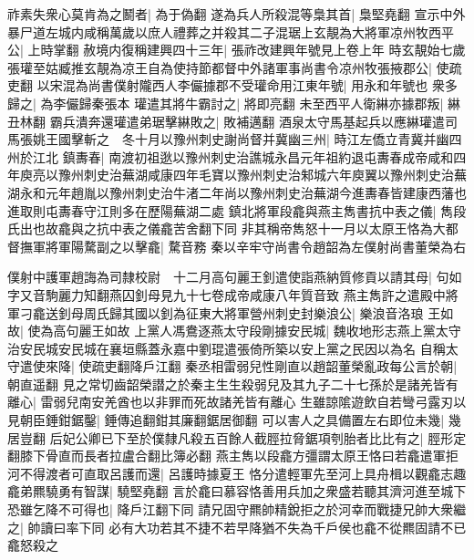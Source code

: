 祚素失衆心莫肯為之鬭者|{
	為于偽翻}
遂為兵人所殺混等梟其首|{
	梟堅堯翻}
宣示中外暴尸道左城内咸稱萬歲以庶人禮葬之并殺其二子混琚上玄靚為大將軍凉州牧西平公|{
	上時掌翻}
赦境内復稱建興四十三年|{
	張祚改建興年號見上卷上年}
時玄靚始七歲張瓘至姑臧推玄靚為凉王自為使持節都督中外諸軍事尚書令凉州牧張掖郡公|{
	使疏吏翻}
以宋混為尚書僕射隴西人李儼據郡不受瓘命用江東年號|{
	用永和年號也}
衆多歸之|{
	為李儼歸秦張本}
瓘遣其將牛霸討之|{
	將即亮翻}
未至西平人衛綝亦據郡叛|{
	綝丑林翻}
霸兵潰奔還瓘遣弟琚擊綝敗之|{
	敗補邁翻}
酒泉太守馬基起兵以應綝瓘遣司馬張姚王國擊斬之　冬十月以豫州刺史謝尚督并冀幽三州|{
	時江左僑立青冀并幽四州於江北}
鎮夀春|{
	南渡初祖逖以豫州刺史治譙城永昌元年祖約退屯夀春成帝咸和四年庾亮以豫州刺史治蕪湖咸康四年毛寶以豫州刺史治邾城六年庾翼以豫州刺史治蕪湖永和元年趙胤以豫州刺史治牛渚二年尚以豫州刺史治蕪湖今進夀春皆建康西藩也進取則屯夀春守江則多在歷陽蕪湖二處}
鎮北將軍段龕與燕主雋書抗中表之儀|{
	雋段氏出也故龕與之抗中表之儀龕苦舍翻下同}
非其稱帝雋怒十一月以太原王恪為大都督撫軍將軍陽騖副之以擊龕|{
	騖音務}
秦以辛牢守尚書令趙韶為左僕射尚書董榮為右

僕射中護軍趙誨為司隸校尉　十二月高句麗王釗遣使詣燕納質修貢以請其母|{
	句如字又音駒麗力知翻燕囚釗母見九十七卷成帝咸康八年質音致}
燕主雋許之遣殿中將軍刁龕送釗母周氏歸其國以釗為征東大將軍營州刺史封樂浪公|{
	樂浪音洛琅}
王如故|{
	使為高句麗王如故}
上黨人馮鴦逐燕太守段剛據安民城|{
	魏收地形志燕上黨太守治安民城安民城在襄垣縣蓋永嘉中劉琨遣張倚所築以安上黨之民因以為名}
自稱太守遣使來降|{
	使疏吏翻降戶江翻}
秦丞相雷弱兒性剛直以趙韶董榮亂政每公言於朝|{
	朝直遥翻}
見之常切齒韶榮譛之於秦主生生殺弱兒及其九子二十七孫於是諸羌皆有離心|{
	雷弱兒南安羌酋也以非罪而死故諸羌皆有離心}
生雖諒隂遊飲自若彎弓露刃以見朝臣錘鉗鋸鑿|{
	錘傳追翻鉗其廉翻鋸居御翻}
可以害人之具備置左右即位未幾|{
	幾居豈翻}
后妃公卿已下至於僕隸凡殺五百餘人截脛拉脅鋸項刳胎者比比有之|{
	脛形定翻膝下骨直而長者拉盧合翻比簿必翻}
燕主雋以段龕方彊謂太原王恪曰若龕遣軍拒河不得渡者可直取呂護而還|{
	呂護時據夏王}
恪分遣輕軍先至河上具舟楫以觀龕志趣龕弟羆驍勇有智謀|{
	驍堅堯翻}
言於龕曰慕容恪善用兵加之衆盛若聽其濟河進至城下恐雖乞降不可得也|{
	降戶江翻下同}
請兄固守羆帥精銳拒之於河幸而戰捷兄帥大衆繼之|{
	帥讀曰率下同}
必有大功若其不捷不若早降猶不失為千戶侯也龕不從羆固請不已龕怒殺之

